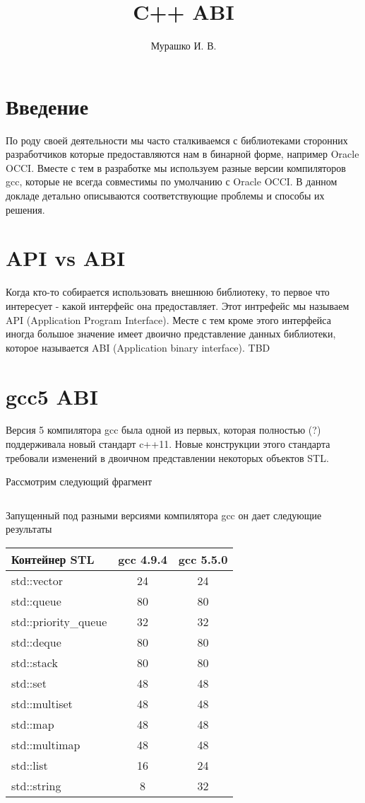 \documentclass[14pt,a4paper]{article}
\title{C++ ABI}
\author{Мурашко И. В.}
\date{}
\begin{document}
\Russian

\maketitle

\section*{Введение}
По роду своей деятельности мы часто сталкиваемся с библиотеками сторонних 
разработчиков которые предоставляются нам в бинарной форме, например 
Oracle OCCI. Вместе с тем в разработке мы используем разные версии 
компиляторов gcc, которые не всегда совместимы по умолчанию с Oracle OCCI. 
В данном докладе детально описываются соответствующие проблемы и способы 
их решения. 

\section{API vs ABI}

Когда кто-то собирается использовать внешнюю библиотеку, то первое что
интересует - какой интерфейс она предоставляет. Этот интрефейс мы
называем API (Application Program Interface). Месте с тем кроме этого
интерфейса иногда большое 
значение имеет двоично представление данных библиотеки, которое
называется ABI (Application binary interface).
TBD

\section{gcc5 ABI}

Версия 5 компилятора gcc была одной из первых, которая полностью (?)
поддерживала новый стандарт c++11. Новые конструкции этого стандарта
требовали изменений в двоичном представлении некоторых объектов STL.

Рассмотрим следующий фрагмент
\inputminted{c++}{./src/sizes.cpp}

Запущенный под разными версиями компилятора gcc он дает следующие
результаты 
\begin{longtable}{|l|c|c|}
\hline
Контейнер STL & gcc 4.9.4 & gcc 5.5.0 \\
\hline
std::vector & 24 & 24 \\
std::queue & 80 & 80 \\
std::priority\_queue & 32 & 32 \\
std::deque & 80 & 80 \\
std::stack & 80 & 80 \\
std::set & 48 & 48 \\
std::multiset & 48 & 48 \\
std::map & 48 & 48 \\
std::multimap & 48 & 48 \\
std::list & 16 & 24 \\
std::string & 8 & 32 \\
\hline
\end{longtable}
\end{document}
